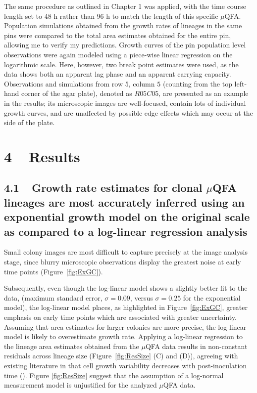 \documentclass{bioinfo}
\begin{document}
{The same procedure as outlined in Chapter 1 was applied, with the time course length set to 48 h rather than 96 h to match the length of this specific $\mu$QFA. Population simulations obtained from the growth rates of lineages in the same pins were compared to the total area estimates obtained for the entire pin, allowing me to verify my predictions. Growth curves of the pin population level observations were again modeled using a piece-wise linear regression on the logarithmic scale. Here, however, two break point estimates were used, as the data shows both an apparent lag phase and an apparent carrying capacity. Observations and simulations from row $5$, column $5$ (counting from the top left-hand corner of the agar plate), denoted as $R05C05$, are presented as an example in the results; its microscopic images are well-focused, contain lots of individual growth curves, and are unaffected by possible edge effects which may occur at the side of the plate.

\vspace{-1.5em}
\section*{4 $\>\>$ Results}

\subsection*{4.1 $\>\>$ Growth rate estimates for clonal $\mu$QFA lineages are most accurately inferred using an exponential growth model on the original scale as compared to a log-linear regression analysis}

Small colony images are most difficult to capture precisely at the image analysis stage, since blurry microscopic observations display the greatest noise at early time points (Figure~\ref{fig:ExGC}). 

Subsequently, even though the log-linear model shows a slightly better fit to the data, (maximum standard error, $\sigma = 0.09$, versus $\sigma=0.25$ for the exponential model), the log-linear model places, as highlighted in Figure~\ref{fig:ExGC}, greater emphasis on early time points which are associated with greater uncertainty. Assuming that area estimates for larger colonies are more precise, the log-linear model is likely to overestimate growth rate. Applying a log-linear regression to the lineage area estimates obtained from the $\mu$QFA data results in non-constant residuals across lineage size (Figure~\ref{fig:ResSize} (C) and (D)), agreeing with existing literature in that cell growth variability decreases with post-inoculation time (\citealp{Robinson01}). Figure \ref{fig:ResSize} suggest that the assumption of a log-normal measurement model is unjustified for the analyzed $\mu$QFA data.

}
\end{document}
